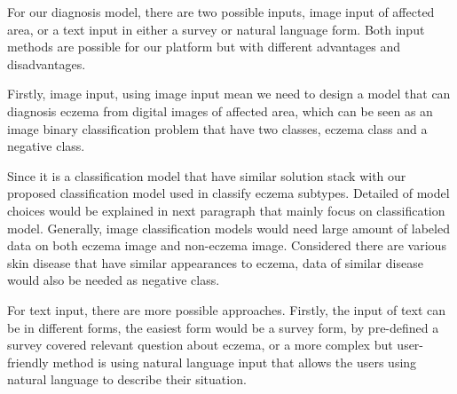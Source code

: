                     For our diagnosis model, there are two possible inputs, image input of affected area, or a text input in either a survey or natural language form. Both input methods are possible for our platform but with different advantages and disadvantages.

                    Firstly, image input, using image input mean we need to design a model that can diagnosis eczema from digital images of affected area, which can be seen as an image binary classification problem that have two classes, eczema class and a negative class.

                    Since it is a classification model that have similar solution stack with our proposed classification model used in classify eczema subtypes. Detailed of model choices would be explained in next paragraph that mainly focus on classification model. Generally, image classification models would need large amount of labeled data on both eczema image and non-eczema image. Considered there are various skin disease that have similar appearances to eczema, data of similar disease would also be needed as negative class.

                    For text input, there are more possible approaches. Firstly, the input of text can be in different forms, the easiest form would be a survey form, by pre-defined a survey covered relevant question about eczema, or a more complex but user-friendly method is using natural language input that allows the users using natural language to describe their situation.

